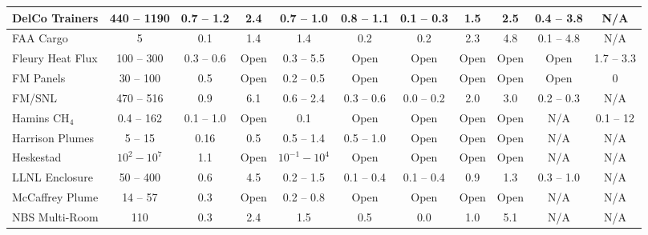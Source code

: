 \begin{landscape}
\begin{longtable}{|l|c|c|c|c|c|c|c|c|c|c|}
DelCo Trainers      & 440 -- 1190   & 0.7 -- 1.2    & 2.4   & 0.7 -- 1.0        & 0.8 -- 1.1          & 0.1 -- 0.3    & 1.5         & 2.5         & 0.4 -- 3.8            & N/A                   \\ \hline
FAA Cargo           & 5             & 0.1           & 1.4   & 1.4               & 0.2                 & 0.2           & 2.3         & 4.8         & 0.1 -- 4.8            & N/A                   \\ \hline
Fleury Heat Flux    & 100 -- 300    & 0.3 -- 0.6    & Open  & 0.3 -- 5.5        & Open                & Open          & Open        & Open        & Open                  & 1.7 -- 3.3            \\ \hline
FM Panels           & 30 -- 100     & 0.5           & Open  & 0.2 -- 0.5        & Open                & Open          & Open        & Open        & Open                  & 0                     \\ \hline
FM/SNL              & 470 -- 516    & 0.9           & 6.1   & 0.6 -- 2.4        & 0.3 -- 0.6          & 0.0 -- 0.2    & 2.0         & 3.0         & 0.2 -- 0.3            & N/A                   \\ \hline
Hamins CH$_4$       & 0.4 -- 162    & 0.1 -- 1.0    & Open  & 0.1               & Open                & Open          & Open        & Open        & N/A                   & 0.1 -- 12             \\ \hline
Harrison Plumes     & 5 -- 15       & 0.16          & 0.5   & 0.5 -- 1.4        & 0.5 -- 1.0          & Open          & Open        & Open        & N/A                   & N/A                   \\ \hline
Heskestad           & $10^2-10^7$   & 1.1           & Open  & $10^{-1}-10^4$    & Open                & Open          & Open        & Open        & N/A                   & N/A                   \\ \hline
LLNL Enclosure      & 50 -- 400     & 0.6           & 4.5   & 0.2 -- 1.5        & 0.1 -- 0.4          & 0.1 -- 0.4    & 0.9         & 1.3         & 0.3 -- 1.0            & N/A                   \\ \hline
McCaffrey Plume     & 14 -- 57      & 0.3           & Open  & 0.2 -- 0.8        & Open                & Open          & Open        & Open        & N/A                   & N/A                   \\ \hline
NBS Multi-Room      & 110           & 0.3           & 2.4   & 1.5               & 0.5                 & 0.0           & 1.0         & 5.1         & N/A                   & N/A                   \\ \hline

\end{longtable}
\end{landscape}
